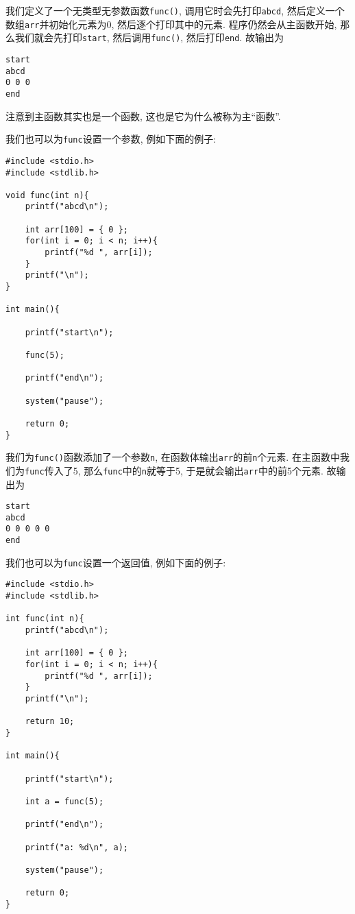         我们定义了一个无类型无参数函数\texttt{func()}, 调用它时会先打印\texttt{abcd}, 然后定义一个数组\texttt{arr}并初始化元素为0, 然后逐个打印其中的元素. 程序仍然会从主函数开始, 那么我们就会先打印\texttt{start}, 然后调用\texttt{func()}, 然后打印\texttt{end}. 故输出为
\begin{lstlisting}
start
abcd
0 0 0
end
\end{lstlisting}

        注意到主函数其实也是一个函数, 这也是它为什么被称为主``函数''.

        我们也可以为\texttt{func}设置一个参数, 例如下面的例子:
\begin{lstlisting}
#include <stdio.h>
#include <stdlib.h>

void func(int n){
    printf("abcd\n");

    int arr[100] = { 0 };
    for(int i = 0; i < n; i++){
        printf("%d ", arr[i]);
    }
    printf("\n");
}

int main(){

    printf("start\n");

    func(5);

    printf("end\n");

    system("pause");

    return 0;
}
\end{lstlisting}

        我们为\texttt{func()}函数添加了一个参数\texttt{n}, 在函数体输出\texttt{arr}的前\texttt{n}个元素. 在主函数中我们为\texttt{func}传入了5, 那么\texttt{func}中的\texttt{n}就等于5, 于是就会输出\texttt{arr}中的前5个元素. 故输出为
\begin{lstlisting}
start
abcd
0 0 0 0 0
end
\end{lstlisting}

        我们也可以为\texttt{func}设置一个返回值, 例如下面的例子:
\begin{lstlisting}
#include <stdio.h>
#include <stdlib.h>

int func(int n){
    printf("abcd\n");

    int arr[100] = { 0 };
    for(int i = 0; i < n; i++){
        printf("%d ", arr[i]);
    }
    printf("\n");

    return 10;
}

int main(){

    printf("start\n");

    int a = func(5);

    printf("end\n");

    printf("a: %d\n", a);

    system("pause");

    return 0;
}
\end{lstlisting}

